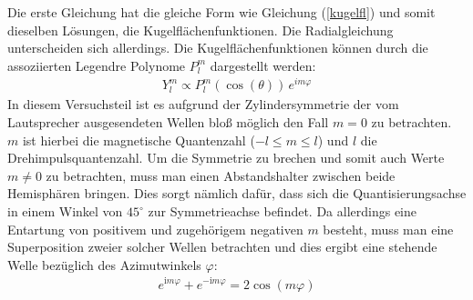 \documentclass[german,  %
parskip=full,  %
]{scrartcl}
\begin{document}
Die erste Gleichung hat die gleiche Form wie Gleichung (\ref{kugelfl}) und somit dieselben Lösungen, die Kugelflächenfunktionen. Die Radialgleichung unterscheiden sich allerdings. Die Kugelflächenfunktionen können durch die assoziierten Legendre Polynome $P^{m}_{l}$ dargestellt werden:
\begin{align}
 Y^{m}_{l} 	\propto P^{m}_{l}(\cos(\theta))\, e^{im\varphi}
\end{align}
In diesem Versuchsteil ist es aufgrund der Zylindersymmetrie der vom Lautsprecher ausgesendeten Wellen bloß möglich den Fall $m = 0$ zu betrachten. $m$ ist hierbei die magnetische Quantenzahl ($-l \leq m \leq l$) und $l$ die Drehimpulsquantenzahl.
\newline
\newline Um die Symmetrie zu brechen und somit auch Werte $m \neq 0$ zu betrachten, muss man einen Abstandshalter zwischen beide Hemisphären bringen. Dies sorgt nämlich dafür, dass sich die Quantisierungsachse in einem Winkel von $45^{\circ}$ zur Symmetrieachse befindet. Da allerdings eine Entartung von positivem und zugehörigem negativen $m$ besteht, muss man eine Superposition zweier solcher Wellen betrachten und dies ergibt eine stehende Welle bezüglich des Azimutwinkels $\varphi$:
\begin{align}
e^{\mathrm{i} m\varphi} + e^{-\mathrm{i} m\varphi} = 2\cos(m\varphi)
\end{align}
\end{document}
